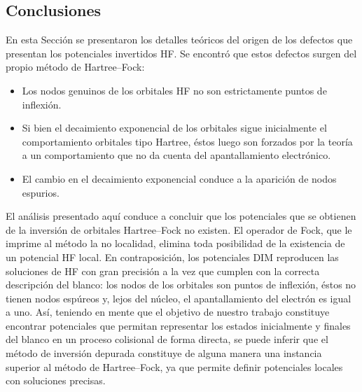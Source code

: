 \subsection{Conclusiones}

En esta Sección se presentaron los detalles teóricos del origen de los
defectos que presentan los potenciales invertidos HF. Se encontró que 
estos defectos surgen del propio método de Hartree--Fock: 
\begin{itemize}
\item Los nodos genuinos de los orbitales HF no son estrictamente puntos de inflexión.
\item Si bien el decaimiento exponencial de los orbitales sigue inicialmente el comportamiento orbitales tipo Hartree, éstos luego son forzados por la teoría a un comportamiento que no da cuenta del apantallamiento electrónico.
\item El cambio en el decaimiento exponencial conduce a la aparición de 
nodos espurios.
\end{itemize}
El análisis presentado aquí conduce a concluir que los potenciales que 
se obtienen de la inversión de orbitales Hartree--Fock no existen. El 
operador de Fock, que le imprime al método la no localidad, elimina toda 
posibilidad de la existencia de un potencial HF local. En 
contraposición, los potenciales DIM reproducen las soluciones de HF con 
gran precisión a la vez que cumplen con la correcta descripción del 
blanco: los nodos de los orbitales son puntos de inflexión, éstos no 
tienen nodos espúreos y, lejos del núcleo, el apantallamiento del 
electrón es igual a uno. Así, teniendo en mente que el objetivo de 
nuestro trabajo constituye encontrar potenciales que permitan 
representar los estados inicialmente y finales del blanco en un proceso 
colisional de forma directa, se puede inferir que el método de inversión 
depurada constituye de alguna manera una instancia superior al método de 
Hartree--Fock, ya que permite definir potenciales locales con soluciones 
precisas.




